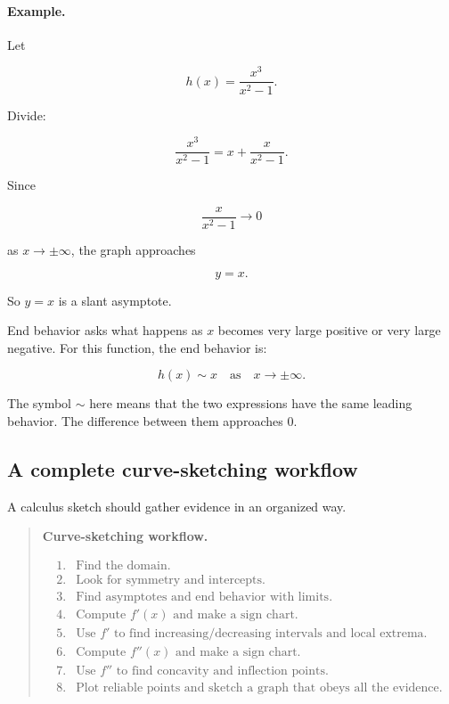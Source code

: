 \paragraph{Example.}
Let

\[
h(x)=\frac{x^3}{x^2-1}.
\]

Divide:

\[
\frac{x^3}{x^2-1}
=
x+\frac{x}{x^2-1}.
\]

Since

\[
\frac{x}{x^2-1}\to0
\]

as \(x\to\pm\infty\), the graph approaches

\[
y=x.
\]

So \(y=x\) is a slant asymptote.

End behavior asks what happens as \(x\) becomes very large positive or very large
negative.  For this function, the end behavior is:

\[
h(x)\sim x
\quad\text{as}\quad
x\to\pm\infty.
\]

The symbol \(\sim\) here means that the two expressions have the same leading
behavior.  The difference between them approaches \(0\).

\subsection{A complete curve-sketching workflow}
\label{subsec:complete-curve-sketching-workflow}

A calculus sketch should gather evidence in an organized way.

\begin{quote}
\textbf{Curve-sketching workflow.}

\[
\begin{array}{ll}
\text{1.} & \text{Find the domain.}\\
\text{2.} & \text{Look for symmetry and intercepts.}\\
\text{3.} & \text{Find asymptotes and end behavior with limits.}\\
\text{4.} & \text{Compute } f'(x) \text{ and make a sign chart.}\\
\text{5.} & \text{Use } f' \text{ to find increasing/decreasing intervals and local extrema.}\\
\text{6.} & \text{Compute } f''(x) \text{ and make a sign chart.}\\
\text{7.} & \text{Use } f'' \text{ to find concavity and inflection points.}\\
\text{8.} & \text{Plot reliable points and sketch a graph that obeys all the evidence.}
\end{array}
\]
\end{quote}

